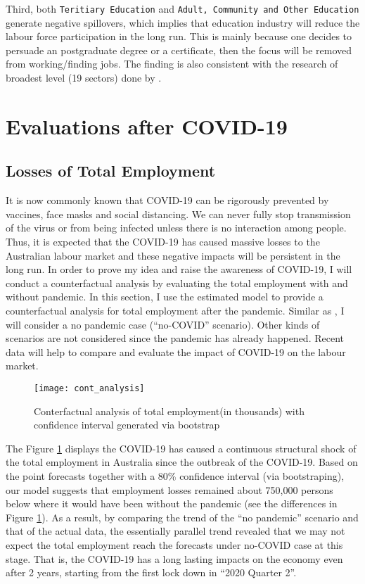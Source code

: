 \documentclass{monashthesis}
\begin{document}
Third, both \texttt{Teritiary\ Education} and \texttt{Adult,\ Community\ and\ Other\ Education} generate negative spillovers, which implies that education industry will reduce the labour force participation in the long run. This is mainly because one decides to persuade an postgraduate degree or a certificate, then the focus will be removed from working/finding jobs. The finding is also consistent with the research of broadest level (19 sectors) done by \textcite{anderson2020}.

\hypertarget{evaluations-after-covid-19}{%
\section{Evaluations after COVID-19}\label{evaluations-after-covid-19}}

\hypertarget{losses-of-total-employment}{%
\subsection{Losses of Total Employment}\label{losses-of-total-employment}}

It is now commonly known that COVID-19 can be rigorously prevented by vaccines, face masks and social distancing. We can never fully stop transmission of the virus or from being infected unless there is no interaction among people. Thus, it is expected that the COVID-19 has caused massive losses to the Australian labour market and these negative impacts will be persistent in the long run. In order to prove my idea and raise the awareness of COVID-19, I will conduct a counterfactual analysis by evaluating the total employment with and without pandemic. In this section, I use the estimated model to provide a counterfactual analysis for total employment after the pandemic. Similar as \textcite{anderson2020}, I will consider a no pandemic case (``no-COVID'' scenario). Other kinds of scenarios are not considered since the pandemic has already happened. Recent data will help to compare and evaluate the impact of COVID-19 on the labour market.

\begin{figure}[H]
\texttt{[image: cont\_analysis]}
\centering
\caption{Conterfactual analysis of total employment(in thousands) with confidence interval generated via bootstrap}
\label{fig:con}
\end{figure}

The Figure \ref{fig:con} displays the COVID-19 has caused a continuous structural shock of the total employment in Australia since the outbreak of the COVID-19. Based on the point forecasts together with a 80\% confidence interval (via bootstraping), our model suggests that employment losses remained about 750,000 persons below where it would have been without the pandemic (see the differences in Figure \ref{fig:con}). As a result, by comparing the trend of the ``no pandemic'' scenario and that of the actual data, the essentially parallel trend revealed that we may not expect the total employment reach the forecasts under no-COVID case at this stage. That is, the COVID-19 has a long lasting impacts on the economy even after 2 years, starting from the first lock down in ``2020 Quarter 2''.
\end{document}
